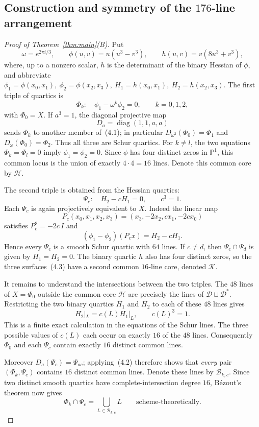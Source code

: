 \documentclass[10pt]{article}
\newcommand{\PP}{\mathbb P}
\begin{document}
\subsection{Construction and symmetry of the $176$-line arrangement}
\begin{proof}[Proof of Theorem~\ref{thm:main}\textup{(B)}]
Put
\[
\omega=e^{2\pi i/3},\qquad
\phi(u,v)=u(u^3-v^3),\qquad
h(u,v)=v(8u^3+v^3),
\]
where, up to a nonzero scalar, $h$ is the determinant of the binary Hessian of $\phi$, and abbreviate
\(
\phi_1=\phi(x_0,x_1),\ \phi_2=\phi(x_2,x_3),\
H_1=h(x_0,x_1),\ H_2=h(x_2,x_3).
\)
The first triple of quartics is
\[
\Phi_k:\quad \phi_1-\omega^k\phi_2=0,
\qquad k=0,1,2,
\tag{4.1}
\]
with \(\Phi_0=X\).  If \(a^3=1\), the diagonal projective map
\[
D_a=\operatorname{diag}(1,1,a,a)
\tag{4.2}
\]
sends \(\Phi_k\) to another member of~(4.1); in particular
\(D_{\omega^2}(\Phi_0)=\Phi_1\) and
\(D_{\omega}(\Phi_0)=\Phi_2\).  Thus all three are Schur quartics.
For \(k\ne l\), the two equations \(\Phi_k=\Phi_l=0\) imply
\(\phi_1=\phi_2=0\).  Since \(\phi\) has four distinct zeros in \(\PP^1\), this common locus is the union of exactly \(4\cdot4=16\) lines.  Denote this common core by \(\mathcal H\).

The second triple is obtained from the Hessian quartics:
\[
\Psi_c:\quad H_2-cH_1=0,
\qquad c^3=1.
\tag{4.3}
\]
Each \(\Psi_c\) is again projectively equivalent to \(X\).  Indeed the linear map
\[
P_c(x_0,x_1,x_2,x_3)=(x_3,-2x_2,cx_1,-2cx_0)
\tag{4.4}
\]
satisfies \(P_c^2=-2c\,I\) and
\[
(\phi_1-\phi_2)(P_cx)=H_2-cH_1.
\tag{4.5}
\]
Hence every \(\Psi_c\) is a smooth Schur quartic with $64$ lines.  If
\(c\ne d\), then \(\Psi_c\cap\Psi_d\) is given by \(H_1=H_2=0\).
The binary quartic \(h\) also has four distinct zeros, so the three
surfaces~(4.3) have a second common $16$-line core, denoted \(\mathcal K\).

It remains to understand the intersections between the two triples.  The
$48$ lines of $X=\Phi_0$ outside the common core $\mathcal H$ are precisely
the lines of $\mathcal D\sqcup\mathcal D^*$.  Restricting the two binary
quartics $H_1$ and $H_2$ to each of these $48$ lines gives
\[
H_2|_L=c(L)H_1|_L,
\qquad c(L)^3=1.
\tag{4.6}
\]
This is a finite exact calculation in the equations of the Schur lines.
The three possible values of $c(L)$ each occur on exactly $16$ of the
$48$ lines.  Consequently $\Phi_0$ and each $\Psi_c$ contain exactly
$16$ distinct common lines.

Moreover \(D_a(\Psi_c)=\Psi_{ac}\); applying~(4.2) therefore shows that
\emph{every} pair \((\Phi_k,\Psi_c)\) contains $16$ distinct common lines.  Denote these lines by
\(\mathcal B_{k,c}\).  Since two distinct smooth quartics have complete-intersection degree $16$, B\'ezout's theorem now gives
\[
\Phi_k\cap\Psi_c=\bigcup_{L\in\mathcal B_{k,c}}L
\qquad\text{scheme-theoretically}.
\tag{4.7}
\]


\end{proof}
\end{document}
